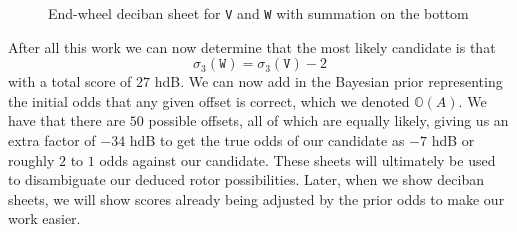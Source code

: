   \begin{figure}[H]
    \begin{center}
    \end{center}

    \caption{End-wheel deciban sheet for \texttt{V} and \texttt{W} with
    summation on the bottom }
  \end{figure}
  \noindent After all this work we can now determine that the most
  likely candidate is that
  \[
    \sigma_3(\texttt{W}) = \sigma_3(\texttt{V}) - 2
  \]
  with a total score of $27$ hdB. We can now add in the Bayesian
  prior representing the initial odds that any given offset is
  correct, which we denoted $\mathbb{O}(A)$. We have that there are
  $50$ possible offsets, all of which are equally likely, giving us
  an extra factor of $-34$ hdB to get the true odds of our candidate
  as $-7$ hdB or roughly $2$ to $1$ odds against our candidate. These
  sheets will ultimately be used to disambiguate our deduced rotor
  possibilities. Later, when we show deciban sheets, we will show
  scores already being adjusted by the prior odds to make our work easier.

